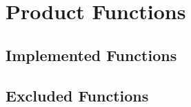 \chapter{Product Functions} \label{ch:product_functions}

\section{Implemented Functions}

\section{Excluded Functions}
